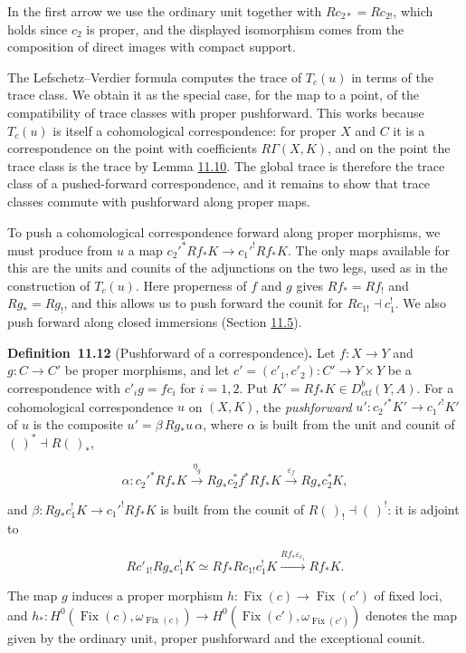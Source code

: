\documentclass[11pt]{article}
\newenvironment{bpstatement}[2]{\par\addvspace{0.6\baselineskip}\noindent\textbf{#1}#2\textbf{.}\enspace\ignorespaces}
  {\par\addvspace{0.4\baselineskip}}
\providecommand{\Fix}{}\renewcommand{\Fix}{\operatorname{Fix}}
\begin{document}
\label{bp34}%
In the first arrow we use the ordinary unit together with \(Rc_{2*}=Rc_{2!}\), which holds since \(c_2\) is proper, and the displayed isomorphism comes from the composition of direct images with compact support.

The Lefschetz–Verdier formula computes the trace of \(T_c(u)\) in terms of the trace class. We obtain it as the special case, for the map to a point, of the compatibility of trace classes with proper pushforward. This works because \(T_c(u)\) is itself a cohomological correspondence: for proper \(X\) and \(C\) it is a correspondence on the point with coefficients \(R\Gamma(X,K)\), and on the point the trace class is the trace by Lemma \hyperref[bp30]{11.10}. The global trace is therefore the trace class of a pushed-forward correspondence, and it remains to show that trace classes commute with pushforward along proper maps.

To push a cohomological correspondence forward along proper morphisms, we must produce from \(u\) a map \(c_2'^*Rf_*K\to c_1'^!Rf_*K\). The only maps available for this are the units and counits of the adjunctions on the two legs, used as in the construction of \(T_c(u)\). Here properness of \(f\) and \(g\) gives \(Rf_*=Rf_!\) and \(Rg_*=Rg_!\), and this allows us to push forward the counit for \(Rc_{1!}\dashv c_1^!\). We also push forward along closed immersions (Section \hyperref[bp40]{11.5}).

\label{bp35}%
\begin{bpstatement}{Definition~11.12}{ (Pushforward of a correspondence)}
Let \(f:X\to Y\) and \(g:C\to C'\) be proper morphisms, and let \(c'=(c'_1,c'_2):C'\to Y\times Y\) be a correspondence with \(c'_ig=fc_i\) for \(i=1,2\). Put \(K'=Rf_*K\in D^b_{\mathrm{ctf}}(Y,A)\). For a cohomological correspondence \(u\) on \((X,K)\), the \emph{pushforward} \(u':c_2'^*K'\to c_1'^!K'\) of \(u\) is the composite \(u'=\beta\,Rg_*u\,\alpha\), where \(\alpha\) is built from the unit and counit of \((\,)^*\dashv R(\,)_*\),

\[
\alpha:c_2'^*Rf_*K\xrightarrow{\eta_g}
Rg_*c_2^*f^*Rf_*K\xrightarrow{\varepsilon_f}Rg_*c_2^*K,
\]

and \(\beta:Rg_*c_1^!K\to c_1'^!Rf_*K\) is built from the counit of \(R(\,)_!\dashv(\,)^!\): it is adjoint to

\[
Rc'_{1!}Rg_*c_1^!K\simeq Rf_*Rc_{1!}c_1^!K
\xrightarrow{Rf_*\varepsilon_{c_1}}Rf_*K.
\]

The map \(g\) induces a proper morphism \(h:\Fix(c)\to \Fix(c')\) of fixed loci, and \(h_*:H^0(\Fix(c),\omega_{\Fix(c)})\to H^0(\Fix(c'),\omega_{\Fix(c')})\) denotes the map given by the ordinary unit, proper pushforward and the exceptional counit.
\end{bpstatement}
\end{document}
